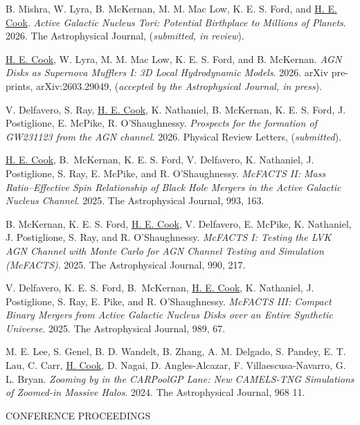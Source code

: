 \hangindent=0.5in \noindent B. Mishra, W. Lyra, B. McKernan, M. M. Mac Low, K. E. S. Ford, and \underline{H. E. Cook}. \textit{Active Galactic Nucleus Tori: Potential Birthplace to Millions of Planets}. 2026. The Astrophysical Journal, (\textit{submitted, in review}).

\hangindent=0.5in \noindent \underline{H. E. Cook}, W. Lyra, M. M. Mac Low, K. E. S. Ford, and B. McKernan. \textit{AGN Disks as Supernova Mufflers I: 3D Local Hydrodynamic Models}. 2026. arXiv pre-prints, arXiv:2603.29049, (\textit{accepted by the Astrophysical Journal, in press}).

\hangindent=0.5in \noindent V. Delfavero, S. Ray, \underline{H. E. Cook}, K. Nathaniel, B. McKernan, K. E. S. Ford, J. Postiglione, E. McPike, R. O'Shaughnessy. \textit{Prospects for the formation of GW231123 from the AGN channel}. 2026. Physical Review Letters, (\textit{submitted}).

\hangindent=0.5in \noindent \underline{H. E. Cook}, B.~McKernan, K. E. S. Ford, V. Delfavero, K. Nathaniel, J. Postiglione, S. Ray, E. McPike, and R. O'Shaughnessy. \textit{McFACTS II: Mass Ratio--Effective Spin Relationship of Black Hole Mergers in the Active Galactic Nucleus Channel}. 2025. The Astrophysical Journal, 993, 163.

\hangindent=0.5in \noindent  B. McKernan, K. E. S. Ford, \underline{H. E. Cook}, V. Delfavero, E. McPike, K. Nathaniel, J. Postiglione, S. Ray, and R. O'Shaughnessy. \textit{McFACTS I: Testing the LVK AGN Channel with Monte Carlo for AGN Channel Testing and Simulation (McFACTS)}. 2025. The Astrophysical Journal, 990, 217.

\hangindent=0.5in \noindent V. Delfavero, K. E. S. Ford, B.~McKernan, \underline{H. E. Cook}, K. Nathaniel, J. Postiglione, S. Ray, E. Pike, and R. O'Shaughnessy. \textit{McFACTS III: Compact Binary Mergers from Active Galactic Nucleus Disks over an Entire Synthetic Universe}. 2025. The Astrophysical Journal, 989, 67.

\hangindent=0.5in \noindent M. E. Lee, S. Genel, B. D. Wandelt, B. Zhang, A. M. Delgado, S. Pandey, E. T. Lau, C. Carr, \underline{H. Cook}, D. Nagai, D. Angles-Alcazar, F. Villaescusa-Navarro, G. L. Bryan. \textit{Zooming by in the CARPoolGP Lane: New CAMELS-TNG Simulations of Zoomed-in Massive Halos}. 2024. The Astrophysical Journal, 968 11.

\begin{center}
CONFERENCE PROCEEDINGS
\end{center}

